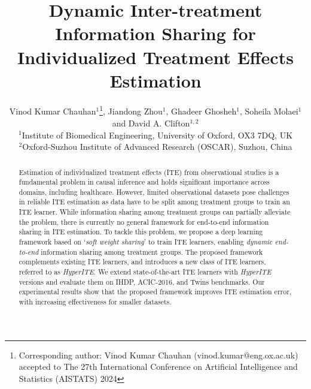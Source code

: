 \documentclass{article}
\title{Dynamic Inter-treatment Information Sharing for Individualized Treatment Effects Estimation}
\author{{\hspace{1mm}Vinod Kumar Chauhan$^1$\thanks{Corresponding author: Vinod Kumar Chauhan (vinod.kumar@eng.ox.ac.uk)\\  accepted to The 27th International Conference on Artificial Intelligence and Statistics (AISTATS) 2024}, Jiandong Zhou$^1$, Ghadeer Ghosheh$^1$, Soheila Molaei$^1$  and David A. Clifton$^{1,2}$} \\
	$^1$Institute of Biomedical Engineering,
	University of Oxford, OX3 7DQ, UK\\
	$^2$Oxford-Suzhou Institute of Advanced Research (OSCAR), Suzhou, China
}
\begin{document}
\maketitle
\begin{abstract}
    Estimation of individualized treatment effects (ITE) from observational studies is a fundamental problem in causal inference and holds significant importance across domains, including healthcare.
    However, limited observational datasets pose challenges in reliable ITE estimation as data have to be split among treatment groups to train an ITE learner. While information sharing among treatment groups can partially alleviate the problem, there is currently no general framework for end-to-end information sharing in ITE estimation.
    To tackle this problem, we propose a deep learning framework based on `\textit{soft weight sharing}' to train ITE learners, enabling \textit{dynamic end-to-end} information sharing among treatment groups. The proposed framework complements existing ITE learners, and introduces a new class of ITE learners, referred to as \textit{HyperITE}.
    We extend state-of-the-art ITE learners with \textit{HyperITE} versions and evaluate them on IHDP, ACIC-2016, and Twins benchmarks. Our experimental results show that the proposed framework improves ITE estimation error, with increasing effectiveness for smaller datasets.



\end{abstract}

\end{document}
